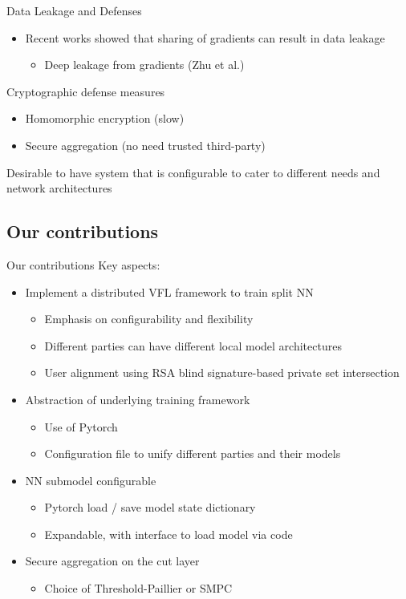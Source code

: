\documentclass[xcolor=dvipsnames]{beamer}
\begin{document}
\begin{frame}{Data Leakage and Defenses}
    \begin{itemize}
        \item Recent works showed that sharing of gradients can result in data leakage 
        \begin{itemize}
            \item Deep leakage from gradients (Zhu et al.)
        \end{itemize}
    \end{itemize}
    Cryptographic defense measures
    \begin{itemize}
        \item Homomorphic encryption (slow)
        \item Secure aggregation (no need trusted third-party)
    \end{itemize}
    Desirable to have system that is configurable to cater to different needs and network architectures
\end{frame}

\subsection{Our contributions}
\begin{frame}{Our contributions}
  Key aspects:
  \begin{itemize}
    \item Implement a distributed VFL framework to train split NN
    \begin{itemize}
        \item Emphasis on configurability and flexibility
        \item Different parties can have different local model architectures
        \item User alignment using RSA blind signature-based private set intersection
    \end{itemize}
    \item Abstraction of underlying training framework
    \begin{itemize}
        \item Use of Pytorch
        \item Configuration file to unify different parties and their models
    \end{itemize}
    \item NN submodel configurable
    \begin{itemize}
      \item Pytorch load / save model state dictionary
      \item Expandable, with interface to load model via code
    \end{itemize}
    \item Secure aggregation on the cut layer
    \begin{itemize}
      \item Choice of Threshold-Paillier or SMPC
    \end{itemize}
  \end{itemize}
\end{frame}
\end{document}
